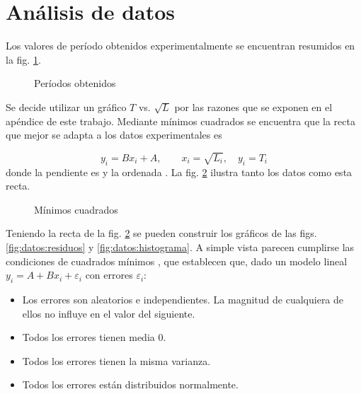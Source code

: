 \section{Análisis de datos}


Los valores de período obtenidos experimentalmente se encuentran resumidos en
la fig. \ref{fig:datos:periodos}.

\begin{figure}[H]
    \centering
    
    \caption{Períodos obtenidos}
    \label{fig:datos:periodos}
\end{figure}

Se decide utilizar un gráfico $T$ vs. $\sqrt{L}$ por las razones que se 
exponen en el apéndice de este trabajo. Mediante mínimos cuadrados se encuentra
que la recta que mejor se adapta a los datos experimentales es

\[
    y_i = Bx_i + A, \quad\quad x_i = \sqrt{L_i}, \quad y_i = T_i
\]
donde la pendiente es  y la ordenada
. La fig. \ref{fig:datos:regresion} ilustra tanto
los datos como esta recta.

\begin{figure}[H]
    \centering
    
    \caption{Mínimos cuadrados}
    \label{fig:datos:regresion}
\end{figure}

Teniendo la recta de la fig. \ref{fig:datos:regresion} se pueden construir los
gráficos de las figs. \ref{fig:datos:residuos} y \ref{fig:datos:histograma}.
A simple vista parecen cumplirse las condiciones de cuadrados mínimos 
\cite[pág. 527]{estadistica}, que establecen que, dado un modelo lineal
$y_i = A + Bx_i + \varepsilon_i$ con errores $\varepsilon_i$:

\begin{itemize}
    \item Los errores son aleatorios e independientes. La magnitud de 
        cualquiera de ellos no influye en el valor del siguiente.
    \item Todos los errores tienen media 0.
    \item Todos los errores tienen la misma varianza.
    \item Todos los errores están distribuidos normalmente.
\end{itemize}

